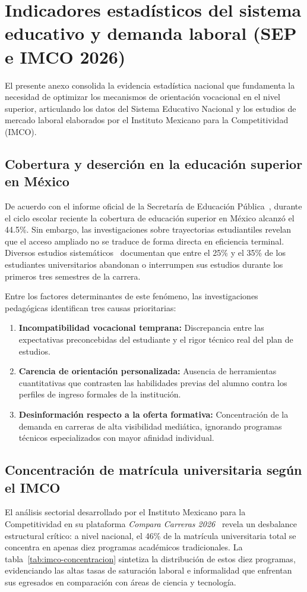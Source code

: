 \chapter{Indicadores estadísticos del sistema educativo y demanda laboral (SEP e IMCO 2026)}\label{anexo:estadisticas}

El presente anexo consolida la evidencia estadística nacional que fundamenta la necesidad de optimizar los mecanismos de orientación vocacional en el nivel superior, articulando los datos del Sistema Educativo Nacional y los estudios de mercado laboral elaborados por el Instituto Mexicano para la Competitividad (IMCO).

\section{Cobertura y deserción en la educación superior en México}
De acuerdo con el informe oficial de la Secretaría de Educación Pública~\cite{SEP2026Cifras}, durante el ciclo escolar reciente la cobertura de educación superior en México alcanzó el 44.5\%. Sin embargo, las investigaciones sobre trayectorias estudiantiles revelan que el acceso ampliado no se traduce de forma directa en eficiencia terminal. Diversos estudios sistemáticos~\cite{Villegas2024,KattMorales2024} documentan que entre el 25\% y el 35\% de los estudiantes universitarios abandonan o interrumpen sus estudios durante los primeros tres semestres de la carrera.

Entre los factores determinantes de este fenómeno, las investigaciones pedagógicas identifican tres causas prioritarias:
\begin{enumerate}
    \item \textbf{Incompatibilidad vocacional temprana:} Discrepancia entre las expectativas preconcebidas del estudiante y el rigor técnico real del plan de estudios.
    \item \textbf{Carencia de orientación personalizada:} Ausencia de herramientas cuantitativas que contrasten las habilidades previas del alumno contra los perfiles de ingreso formales de la institución.
    \item \textbf{Desinformación respecto a la oferta formativa:} Concentración de la demanda en carreras de alta visibilidad mediática, ignorando programas técnicos especializados con mayor afinidad individual.
\end{enumerate}

\section{Concentración de matrícula universitaria según el IMCO}
El análisis sectorial desarrollado por el Instituto Mexicano para la Competitividad en su plataforma \textit{Compara Carreras 2026}~\cite{IMCO2026} revela un desbalance estructural crítico: a nivel nacional, el 46\% de la matrícula universitaria total se concentra en apenas diez programas académicos tradicionales. La tabla~\ref{tab:imco-concentracion} sintetiza la distribución de estos diez programas, evidenciando las altas tasas de saturación laboral e informalidad que enfrentan sus egresados en comparación con áreas de ciencia y tecnología.

